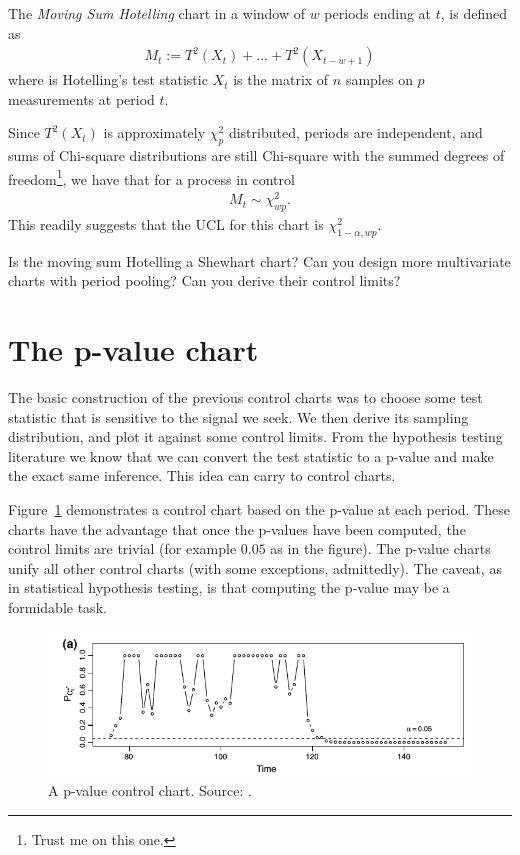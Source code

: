 \begin{definition}
The \emph{Moving Sum Hotelling} chart in a window of $w$ periods ending at $t$, is defined as
\begin{align}
	M_t:= T^2(X_t)+\dots+T^2(X_{t-w+1})
\end{align}
where \tsq is Hotelling's test statistic $X_t$ is the matrix of $n$ samples on $p$ measurements at period $t$. 
\end{definition}

Since $T^2(X_t)$ is approximately $\chi^2_p$ distributed, periods are independent, and sums of Chi-square distributions are still Chi-square with the summed degrees of freedom\footnote{Trust me on this one.}, we have that for a process in control
\begin{align}
	M_t \sim \chi^2_{wp}.
\end{align}
This readily suggests that the UCL for this chart is $\chi^2_{1-\alpha,wp}$. 

\begin{think}
Is the moving sum Hotelling a Shewhart chart? 
Can you design more multivariate charts with period pooling? 
Can you derive their control limits?
\end{think}





\section{The p-value chart}
The basic construction of the previous control charts was to choose some test statistic that is sensitive to the signal  we seek. We then derive its sampling distribution, and plot it against some control limits. 
From the hypothesis testing literature we know that we can convert the test statistic to a p-value and make the exact same inference. 
This idea can carry to control charts.

Figure~\ref{fig:p-value-chart} demonstrates a control chart based on the p-value at each period.
These charts have the advantage that once the p-values have been computed, the control limits are trivial (for example $0.05$ as in the figure).
The p-value charts unify all other control charts (with some exceptions, admittedly). 
The caveat, as in statistical hypothesis testing, is that computing the p-value may be a formidable task. 

\begin{figure}[t]
\centering
\includegraphics[width=0.7\linewidth]{art/p-value-chart}
\caption{\footnotesize
A p-value control chart. Source: \cite{li_using_2012}.}
\label{fig:p-value-chart}
\end{figure}





